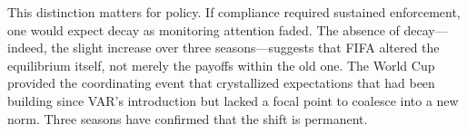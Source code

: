 This distinction matters for policy. If compliance required sustained
enforcement, one would expect decay as monitoring attention faded. The
absence of decay---indeed, the slight increase over three
seasons---suggests that FIFA altered the equilibrium itself, not merely
the payoffs within the old one. The World Cup provided the coordinating
event that crystallized expectations that had been building since VAR's
introduction but lacked a focal point to coalesce into a new norm.
Three seasons have confirmed that the shift is permanent.

